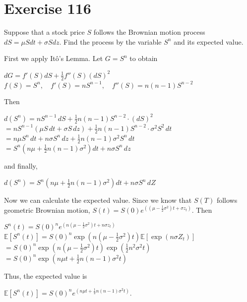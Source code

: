 \documentclass{article}
\begin{document}
\section*{Exercise 116}
Suppose that a stock price $S$ follows the Brownian motion process $dS = \mu S dt + \sigma S dz$. Find the process by the variable $S^n$ and its expected value.
\begin{flushleft}
    First we apply Itô's Lemma. Let $G=S^n$ to obtain
    \begin{center}
        $dG = f'(S) dS + \frac{1}{2} f''(S) (dS)^2$ \\
        $f(S) = S^n, \quad f'(S) = n S^{n-1}, \quad f''(S) = n(n-1) S^{n-2}$
    \end{center}
    Then
    \begin{center}
        $d(S^n) = n S^{n-1} \, dS + \frac{1}{2} n(n-1) S^{n-2} \cdot (dS)^2$ \\
        $= n S^{n-1} (\mu S \, dt + \sigma S \, dz) + \frac{1}{2} n(n-1) S^{n-2} \cdot \sigma^2 S^2 \, dt $\\
        $= n \mu S^n \, dt + n \sigma S^n \, dz + \frac{1}{2} n(n-1) \sigma^2 S^n \, dt$ \\
        $= S^n \left( n \mu + \frac{1}{2} n(n-1) \sigma^2 \right) dt + n \sigma S^n \, dz$
    \end{center}
    and finally,
    \begin{center}
        $d(S^n) = S^n \left( n \mu + \frac{1}{2} n(n-1) \sigma^2 \right) dt + n \sigma S^n \, dZ$
    \end{center}
    Now we can calculate the expected value. Since we know that $S(T)$ follows geometric Brownian motion, $S(t) = S(0) e^{\left( \left( \mu - \frac{1}{2} \sigma^2 \right)t + \sigma z_t \right)}$. Then
    \begin{center}
        $S^n(t) = S(0)^n e^{\left( n\left( \mu - \frac{1}{2} \sigma^2 \right)t + n \sigma z_t \right)}$ \\
        $\mathbb{E}[S^n(t)] = S(0)^n \exp\left( n\left( \mu - \frac{1}{2} \sigma^2 \right)t \right) \mathbb{E}\left[ \exp(n \sigma Z_t) \right] $ \\
        $= S(0)^n \exp\left( n\left( \mu - \frac{1}{2} \sigma^2 \right)t \right) \exp\left( \frac{1}{2} n^2 \sigma^2 t \right) $ \\
        $= S(0)^n \exp\left( n \mu t + \frac{1}{2} n(n-1) \sigma^2 t \right)$
    \end{center}
    Thus, the expected value is
    \begin{center}
        $\mathbb{E}[S^n(t)] = S(0)^n e^{\left( n \mu t + \frac{1}{2} n(n-1) \sigma^2 t \right)}$.
    \end{center}
\end{flushleft}
\end{document}
